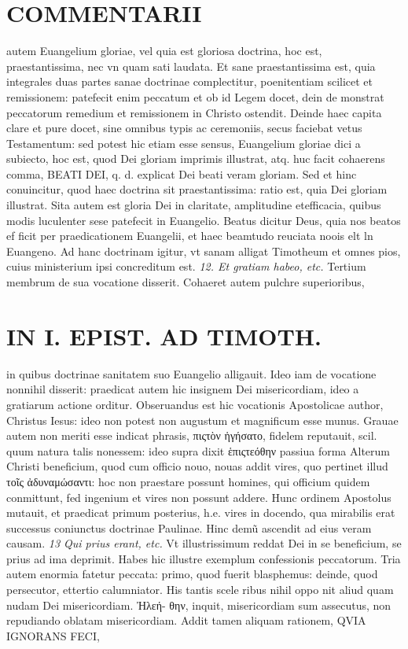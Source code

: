 \documentclass{article}
\begin{document}
\begin{pages}
\section*{COMMENTARII }
\marginpar{[ p.30 ]}\pstart autem Euangelium gloriae, vel quia est gloriosa doctrina, hoc est, praestantissima, nec vn quam sati laudata.  \pend\pstart Et sane praestantissima est, quia integrales duas partes sanae doctrinae complectitur, poenitentiam scilicet et remissionem: patefecit enim peccatum et ob id Legem docet, dein de monstrat peccatorum remedium et remissionem in Christo ostendit. Deinde haec capita clare et pure docet, sine omnibus typis ac ceremoniis, secus faciebat vetus Testamentum: sed potest hic etiam esse sensus, Euangelium gloriae dici a subiecto, hoc est, quod Dei gloriam imprimis illustrat, atq. huc facit cohaerens comma, BEATI DEI, q. d. explicat Dei beati veram gloriam. Sed et hinc conuincitur, quod haec doctrina sit praestantissima: ratio est, quia Dei gloriam illustrat. Sita autem est gloria Dei in claritate, amplitudine etefficacia, quibus modis luculenter sese patefecit in Euangelio. Beatus dicitur Deus, quia nos beatos ef ficit per praedicationem Euangelii, et haec beamtudo reuciata noois elt ln Euangeno.  \pend\pstart Ad hanc doctrinam igitur, vt sanam alligat Timotheum et omnes pios, cuius ministerium ipsi concreditum est.  \pend
\textit{12. Et gratiam habeo, etc. }\pstart Tertium membrum de sua vocatione disserit. Cohaeret autem pulchre superioribus,  \pend
\section*{IN I. EPIST. AD TIMOTH. }
\marginpar{[ p.31 ]}\pstart in quibus doctrinae sanitatem suo Euangelio alligauit. Ideo iam de vocatione nonnihil disserit: praedicat autem hic insignem Dei misericordiam, ideo a gratiarum actione orditur. Obseruandus est hic vocationis Apostolicae author, Christus Iesus: ideo non potest non augustum et magnificum esse munus. Grauae autem non meriti esse indicat phrasis, πιςτὸν ἡγήσατο, fidelem reputauit, scil. quum natura talis nonessem: ideo supra dixit ἑπιςτεόθην passiua forma Alterum Christi beneficium, quod cum officio nouo, nouas addit vires, quo pertinet illud τοῖς ἀδυναμώσαντι: hoc non praestare possunt homines, qui officium quidem conmittunt, fed ingenium et vires non possunt addere. Hunc ordinem Apostolus mutauit, et praedicat primum posterius, h.e. vires in docendo, qua mirabilis erat successus coniunctus doctrinae Paulinae. Hinc demũ ascendit ad eius veram causam.  \pend
\textit{13 Qui prius erant, etc. }\pstart Vt illustrissimum reddat Dei in se beneficium, se prius ad ima deprimit. Habes hic illustre exemplum confessionis peccatorum. Tria autem enormia fatetur peccata: primo, quod fuerit blasphemus: deinde, quod persecutor, ettertio calumniator. His tantis scele ribus nihil oppo nit aliud quam nudam Dei misericordiam. Ἠλεή- θην, inquit, misericordiam sum assecutus, non repudiando oblatam misericordiam. Addit tamen aliquam rationem, QVIA IGNORANS FECI,  \pend

\end{pages}
\end{document}
